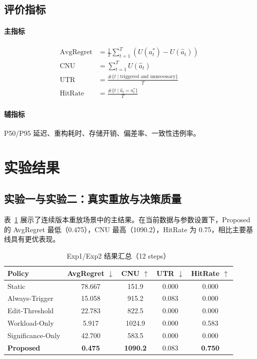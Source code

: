 \documentclass[12pt,a4paper]{ctexart}
\newcommand{\toprule}{\hline}
\newcommand{\midrule}{\hline}
\newcommand{\bottomrule}{\hline}
\begin{document}
\subsection{评价指标}
\paragraph{主指标}
\begin{align}
\mathrm{AvgRegret} &= \frac{1}{T}\sum_{t=1}^{T}\left(U(a_t^*)-U(\hat a_t)\right) \\
\mathrm{CNU} &= \sum_{t=1}^{T}U(\hat a_t) \\
\mathrm{UTR} &= \frac{\#\{t \mid \text{triggered and unnecessary}\}}{T} \\
\mathrm{HitRate} &= \frac{\#\{t \mid \hat a_t=a_t^*\}}{T}
\end{align}

\paragraph{辅指标}
P50/P95 延迟、重构耗时、存储开销、偏差率、一致性违例率。

\section{实验结果}
\subsection{实验一与实验二：真实重放与决策质量}
表~\ref{tab:exp12} 展示了连续版本重放场景中的主结果。在当前数据与参数设置下，Proposed 的 AvgRegret 最低（0.475），CNU 最高（1090.2），HitRate 为 0.75，相比主要基线具有更优表现。

\begin{table}[H]
\centering
\caption{Exp1/Exp2 结果汇总（12 steps）}
\label{tab:exp12}
\begin{tabular}{lcccc}
\toprule
Policy & AvgRegret $\downarrow$ & CNU $\uparrow$ & UTR $\downarrow$ & HitRate $\uparrow$ \\
\midrule
Static & 78.667 & 151.9 & 0.000 & 0.000 \\
Always-Trigger & 15.058 & 915.2 & 0.083 & 0.000 \\
Edit-Threshold & 22.783 & 822.5 & 0.000 & 0.000 \\
Workload-Only & 5.917 & 1024.9 & 0.000 & 0.583 \\
Significance-Only & 42.700 & 583.5 & 0.000 & 0.000 \\
\textbf{Proposed} & \textbf{0.475} & \textbf{1090.2} & 0.083 & \textbf{0.750} \\
\bottomrule
\end{tabular}
\end{table}
\end{document}
